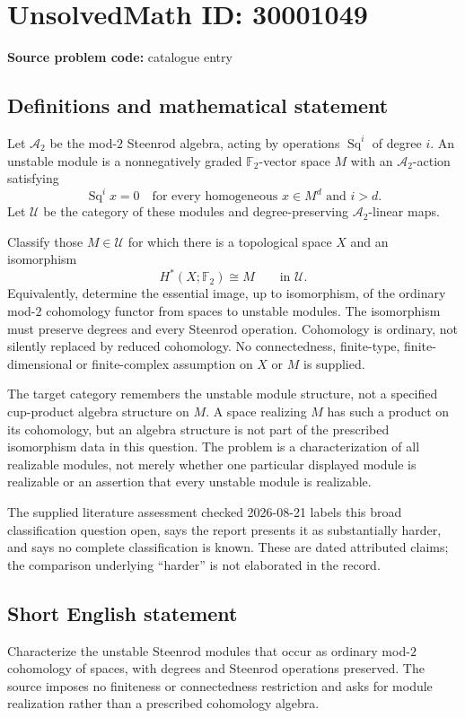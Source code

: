 \documentclass[11pt]{article}
\newcommand{\F}{\mathbb{F}}
\begin{document}
\section*{UnsolvedMath ID: 30001049}
\textbf{Source problem code:} catalogue entry
\subsection{Definitions and mathematical statement}
Let $\mathcal A_2$ be the mod-$2$ Steenrod algebra, acting by operations $\operatorname{Sq}^i$ of degree $i$. An unstable module is a nonnegatively graded $\F_2$-vector space $M$ with an $\mathcal A_2$-action satisfying
\[
\operatorname{Sq}^i x=0\quad\text{for every homogeneous }x\in M^d\text{ and }i>d.
\]
Let $\mathcal U$ be the category of these modules and degree-preserving $\mathcal A_2$-linear maps.

Classify those $M\in\mathcal U$ for which there is a topological space $X$ and an isomorphism
\[
H^*(X;\F_2)\cong M\qquad\text{in }\mathcal U.
\]
Equivalently, determine the essential image, up to isomorphism, of the ordinary mod-$2$ cohomology functor from spaces to unstable modules. The isomorphism must preserve degrees and every Steenrod operation. Cohomology is ordinary, not silently replaced by reduced cohomology. No connectedness, finite-type, finite-dimensional or finite-complex assumption on $X$ or $M$ is supplied.

The target category remembers the unstable module structure, not a specified cup-product algebra structure on $M$. A space realizing $M$ has such a product on its cohomology, but an algebra structure is not part of the prescribed isomorphism data in this question. The problem is a characterization of all realizable modules, not merely whether one particular displayed module is realizable or an assertion that every unstable module is realizable.

The supplied literature assessment checked 2026-08-21 labels this broad classification question open, says the report presents it as substantially harder, and says no complete classification is known. These are dated attributed claims; the comparison underlying ``harder'' is not elaborated in the record.
\subsection{Short English statement}
Characterize the unstable Steenrod modules that occur as ordinary mod-$2$ cohomology of spaces, with degrees and Steenrod operations preserved. The source imposes no finiteness or connectedness restriction and asks for module realization rather than a prescribed cohomology algebra.
\end{document}
